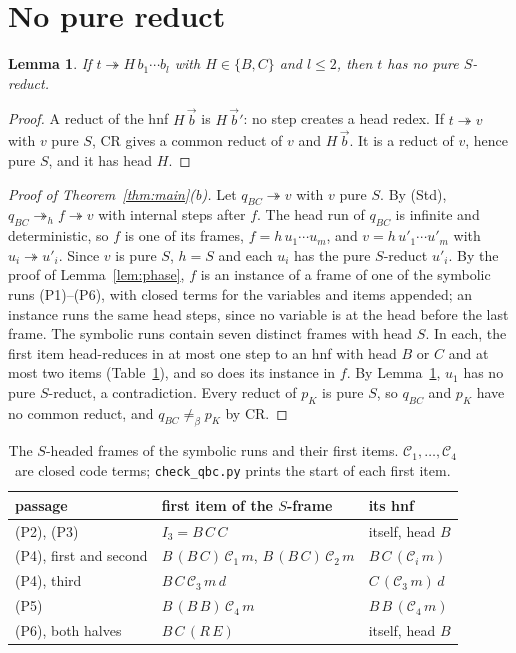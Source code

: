 \documentclass[11pt]{amsart}
\newtheorem{lemma}[theorem]{Lemma}
\theoremstyle{definition}
\newcommand{\red}{\twoheadrightarrow}
\newcommand{\hred}{\twoheadrightarrow_h}
\newcommand{\nconv}{\neq_\beta}
\newcommand{\pK}{p_K}
\newcommand{\qBC}{q_{BC}}
\newcommand{\Ir}{I_3}
\begin{document}
\section{No pure reduct}\label{sec:nopure}

\begin{lemma}\label{lem:stuck}
If $t\red H\,b_1\cdots b_l$ with $H\in\{B,C\}$ and $l\le2$, then $t$ has no pure $S$-reduct.
\end{lemma}

\begin{proof}
A reduct of the hnf $H\,\vec b$ is $H\,\vec b'$: no step creates a head redex. If $t\red v$ with $v$ pure
$S$, CR gives a common reduct of $v$ and $H\,\vec b$. It is a reduct of $v$, hence pure $S$, and it has
head $H$.
\end{proof}

\begin{proof}[Proof of Theorem~\ref{thm:main}\textup{(b)}]
Let $\qBC\red v$ with $v$ pure $S$. By (Std), $\qBC\hred f\red v$ with internal steps after $f$. The
head run of $\qBC$ is infinite and deterministic, so $f$ is one of its frames, $f=h\,u_1\cdots u_m$, and
$v=h\,u'_1\cdots u'_m$ with $u_i\red u'_i$. Since $v$ is pure $S$, $h=S$ and each $u_i$ has the pure
$S$-reduct $u'_i$. By the proof of Lemma~\ref{lem:phase}, $f$ is an instance of a frame of one of the
symbolic runs (P1)--(P6), with closed terms for the variables and items appended; an instance runs the
same head steps, since no variable is at the head before the last frame. The symbolic runs contain seven
distinct frames with head $S$. In each, the first item head-reduces in at most one step to an hnf with
head $B$ or $C$ and at most two items (Table~\ref{tab:sframes}), and so does its instance in $f$. By
Lemma~\ref{lem:stuck}, $u_1$ has no pure $S$-reduct, a contradiction. Every reduct of $\pK$ is pure $S$,
so $\qBC$ and $\pK$ have no common reduct, and $\qBC\nconv\pK$ by CR.
\end{proof}

\begin{table}[h]\small
\caption{The $S$-headed frames of the symbolic runs and their first items. $\mathcal C_1,\dots,\mathcal C_4$
are closed code terms; \texttt{check\_qbc.py} prints the start of each first item.}\label{tab:sframes}
\begin{tabular}{lll}
passage & first item of the $S$-frame & its hnf\\\hline
(P2), (P3) & $\Ir=B\,C\,C$ & itself, head $B$\\
(P4), first and second & $B\,(B\,C)\,\mathcal C_1\,m$, $B\,(B\,C)\,\mathcal C_2\,m$ & $B\,C\,(\mathcal C_i\,m)$\\
(P4), third & $B\,C\,\mathcal C_3\,m\,d$ & $C\,(\mathcal C_3\,m)\,d$\\
(P5) & $B\,(B\,B)\,\mathcal C_4\,m$ & $B\,B\,(\mathcal C_4\,m)$\\
(P6), both halves & $B\,C\,(R\,E)$ & itself, head $B$
\end{tabular}
\end{table}
\end{document}
